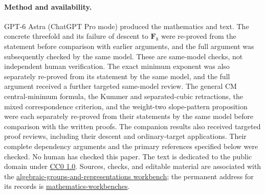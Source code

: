 \documentclass[11pt,a4paper]{article}
\newcommand{\workbenchurl}{https://github.com/KokunoYumeto/algebraic-groups-and-representations-workbench}
\newcommand{\recordurl}{https://github.com/KokunoYumeto/mathematics-workbenches}
\newcommand{\F}{\mathbf F}
\theoremstyle{definition}
\theoremstyle{remark}
\begin{document}
\paragraph{Method and availability.}
GPT-6 Astra (ChatGPT Pro mode) produced the mathematics and text.
The concrete threefold and its failure of descent to $\F_8$ were
re-proved from the statement before comparison with earlier
arguments, and the full argument was subsequently checked by the
same model. These are same-model checks, not independent human
verification. The exact minimum exponent was also separately
re-proved from its statement by the same model, and the full
argument received a further targeted same-model review. The
general CM central-minimum formula, the Kummer and separated-cubic
retractions, the mixed correspondence
criterion, and the weight-two slope-pattern proposition were each
separately re-proved from their statements by the same model
before comparison with the written proofs. The companion results
also received targeted proof reviews, including their descent and
ordinary-target applications. Their complete dependency arguments
and the primary references specified below were checked.
No human has checked this paper. The text is dedicated
to the public domain under
\href{https://creativecommons.org/publicdomain/zero/1.0/}{CC0 1.0}.
Sources, checks, and editable material are associated with the
\href{\workbenchurl}{algebraic-groups-and-representations workbench}; the
permanent address for its records is
\href{\recordurl}{mathematics-workbenches}.
\end{document}
